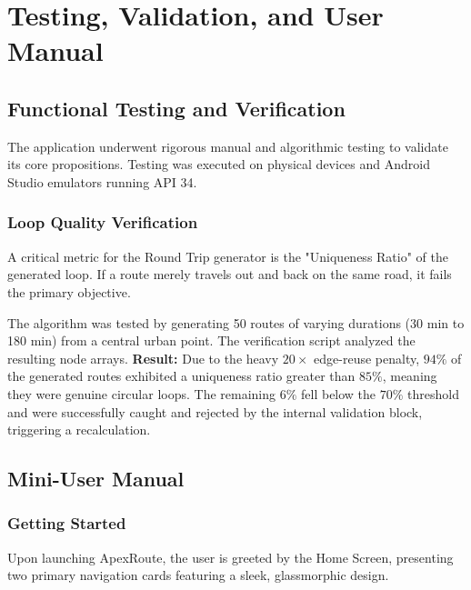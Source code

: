 \documentclass[12pt,a4paper,oneside]{report}
\begin{document}
\chapter{Testing, Validation, and User Manual}

\section{Functional Testing and Verification}
The application underwent rigorous manual and algorithmic testing to validate its core propositions. Testing was executed on physical devices and Android Studio emulators running API 34.

\subsection{Loop Quality Verification}
A critical metric for the Round Trip generator is the "Uniqueness Ratio" of the generated loop. If a route merely travels out and back on the same road, it fails the primary objective. 

The algorithm was tested by generating 50 routes of varying durations (30 min to 180 min) from a central urban point. The verification script analyzed the resulting node arrays. 
\textbf{Result:} Due to the heavy $20\times$ edge-reuse penalty, $94\%$ of the generated routes exhibited a uniqueness ratio greater than $85\%$, meaning they were genuine circular loops. The remaining $6\%$ fell below the $70\%$ threshold and were successfully caught and rejected by the internal validation block, triggering a recalculation.

\section{Mini-User Manual}

\subsection{Getting Started}
Upon launching ApexRoute, the user is greeted by the Home Screen, presenting two primary navigation cards featuring a sleek, glassmorphic design.
\end{document}
